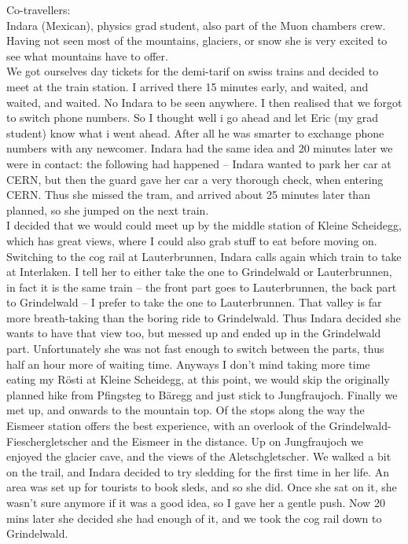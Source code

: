 Co-travellers:\\
Indara (Mexican), physics grad student, also part of the Muon chambers crew. Having not seen most of the mountains, glaciers, or snow she is very excited to see what mountains have to offer.\\

 We got ourselves day tickets for the demi-tarif on swiss trains and decided to meet at the train station. I arrived there 15 minutes early, and waited, and waited, and waited. No Indara to be seen anywhere. I then realised that we forgot to switch phone numbers. So I thought well i go ahead and let Eric (my grad student) know what i went ahead. After all he was smarter to exchange phone numbers with any newcomer. Indara had the same idea and 20 minutes later we were in contact: the following had happened -- Indara wanted to park her car at CERN, but then the guard gave her car a very thorough check, when entering CERN. Thus she missed the tram, and arrived about 25 minutes later than planned, so she jumped on the next train.\\
 I decided that we would could meet up by the middle station of Kleine Scheidegg, which has great views, where I could also grab stuff to eat before moving on. Switching to the cog rail at Lauterbrunnen, Indara calls again which train to take at Interlaken. I tell her to either take the one to Grindelwald or Lauterbrunnen, in fact it is the same train -- the front part goes to Lauterbrunnen, the back part to Grindelwald -- I prefer to take the one to Lauterbrunnen. That valley is far more breath-taking than the boring ride to Grindelwald. Thus Indara decided she wants to have that view too, but messed up and ended up in the Grindelwald part. Unfortunately she was not fast enough to switch between the parts, thus half an hour more of waiting time. Anyways I don't mind taking more time eating my R\"osti at Kleine Scheidegg, at this point, we would skip the originally planned hike from Pfingsteg to B\"aregg and just stick to Jungfraujoch. Finally we met up, and onwards to the mountain top. Of the stops along the way the Eismeer station offers the best experience, with an overlook of the Grindelwald-Fieschergletscher and the Eismeer in the distance. Up on Jungfraujoch we enjoyed the glacier cave, and the views of the Aletschgletscher. We walked a bit on the trail, and Indara decided to try sledding for the first time in her life. An area was set up for tourists to book sleds, and so she did. Once she sat on it, she wasn't sure anymore if it was a good idea, so I gave her a gentle push. Now 20 mins later she decided she had enough of it, and we took the cog rail down to Grindelwald. \\
